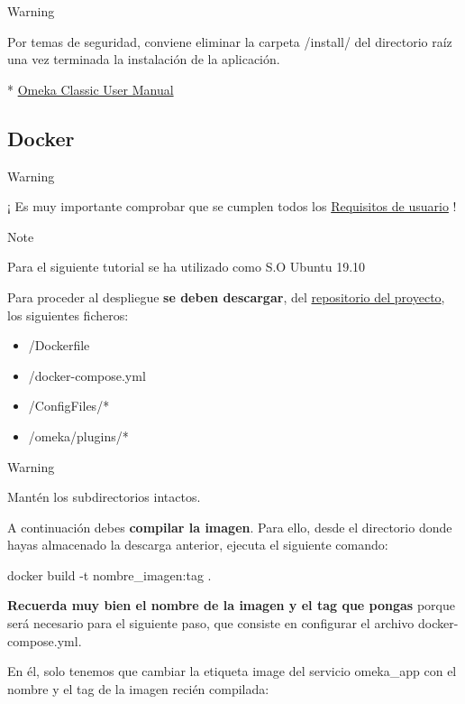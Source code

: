 \documentclass[
]{article}
\newenvironment{Shaded}{}{}
\newcommand{\ExtensionTok}[1]{#1}
\newcommand{\NormalTok}[1]{#1}
\providecommand{\tightlist}{%
  \setlength{\itemsep}{0pt}\setlength{\parskip}{0pt}}
\begin{document}
Warning

Por temas de seguridad, conviene eliminar la carpeta {/install/} del
directorio raíz una vez terminada la instalación de la aplicación.

* \href{https://omeka.org/classic/docs/Installation/Installation/}{Omeka
Classic User Manual}

\hypertarget{docker-1}{%
\subsection{Docker}\label{docker-1}}

Warning

¡ Es muy importante comprobar que se cumplen todos los
\protect\hyperlink{requisitos-de-usuario}{Requisitos de usuario} !

Note

Para el siguiente tutorial se ha utilizado como S.O Ubuntu 19.10

Para proceder al despliegue \textbf{se deben descargar}, del
\href{https://github.com/gcm1001/TFG-CeniehAriadne}{repositorio del
proyecto}, los siguientes ficheros:

\begin{itemize}
\tightlist
\item
  {/Dockerfile}
\item
  {/docker-compose.yml}
\item
  {/ConfigFiles/*}
\item
  {/omeka/plugins/*}
\end{itemize}

Warning

Mantén los subdirectorios intactos.

A continuación debes \textbf{compilar la imagen}. Para ello, desde el
directorio donde hayas almacenado la descarga anterior, ejecuta el
siguiente comando:

\begin{Shaded}
\begin{Highlighting}[]
\ExtensionTok{docker}\NormalTok{ build {-}t nombre\_imagen:tag .}
\end{Highlighting}
\end{Shaded}

\textbf{Recuerda muy bien el nombre de la imagen y el tag que pongas}
porque será necesario para el siguiente paso, que consiste en configurar
el archivo {docker-compose.yml}.

En él, solo tenemos que cambiar la etiqueta {image} del servicio
{omeka\_app} con el nombre y el tag de la imagen recién compilada:
\end{document}
